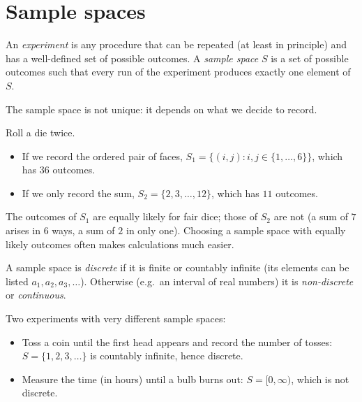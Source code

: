 \section{Sample spaces}

\begin{definition}
An \emph{experiment} is any procedure that can be repeated (at least in principle) and has
a well-defined set of possible outcomes. A \emph{sample space} $S$ is a set of possible
outcomes such that every run of the experiment produces exactly one element of $S$.
\end{definition}

The sample space is not unique: it depends on what we decide to record.

\begin{example}
Roll a die twice.
\begin{itemize}
  \item If we record the ordered pair of faces,
        $S_1 = \{(i,j) : i,j \in \{1,\dots,6\}\}$, which has $36$ outcomes.
  \item If we only record the sum, $S_2 = \{2,3,\dots,12\}$, which has $11$ outcomes.
\end{itemize}
The outcomes of $S_1$ are equally likely for fair dice; those of $S_2$ are not (a sum of
$7$ arises in $6$ ways, a sum of $2$ in only one). Choosing a sample space with equally
likely outcomes often makes calculations much easier.
\end{example}

\begin{definition}
A sample space is \emph{discrete} if it is finite or countably infinite (its elements can
be listed $a_1, a_2, a_3, \dots$). Otherwise (e.g.\ an interval of real numbers) it is
\emph{non-discrete} or \emph{continuous}.
\end{definition}

\begin{example}
Two experiments with very different sample spaces:
\begin{itemize}
  \item Toss a coin until the first head appears and record the number of tosses:
        $S = \{1,2,3,\dots\}$ is countably infinite, hence discrete.
  \item Measure the time (in hours) until a bulb burns out: $S = [0,\infty)$, which is
        not discrete.
\end{itemize}
\end{example}

